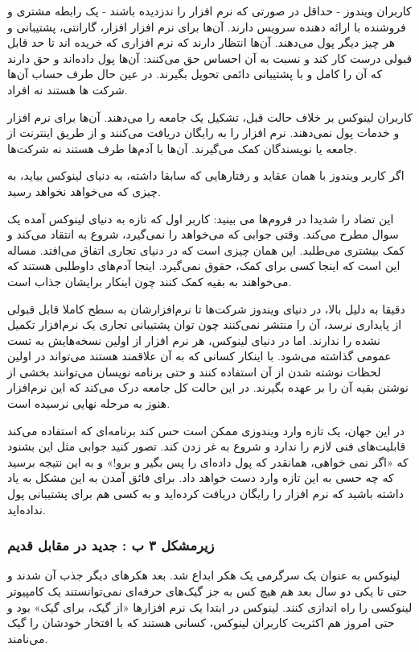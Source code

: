 کاربران ویندوز - حداقل در صورتی که نرم افزار را ندزدیده باشند - یک رابطه مشتری و فروشنده با ارائه دهنده سرویس دارند. آن‌ها برای نرم افزار افزار، گارانتی، پشتیبانی و هر چیز دیگر پول می‌دهند. آن‌ها انتظار دارند که نرم افزاری که خریده اند تا حد قابل قبولی درست کار کند و نسبت به آن احساس حق می‌کنند: آن‌ها پول داده‌اند و حق دارند که آن را کامل و با پشتیبانی دائمی تحویل بگیرند. در عین حال طرف حساب آن‌ها شرکت ها هستند نه افراد.

کاربران لینوکس بر خلاف حالت قبل، تشکیل یک جامعه را می‌دهند. آن‌ها برای نرم افزار و خدمات پول نمی‌دهند. نرم افزار را به رایگان دریافت می‌کنند و از طریق اینترنت از جامعه یا نویسندگان کمک می‌گیرند. آن‌ها با آدم‌ها طرف هستند نه شرکت‌ها.

اگر کاربر ویندوز با همان عقاید و رفتارهایی که سابقا داشته، به دنیای لینوکس بیاید، به چیزی که می‌خواهد نخواهد رسید.

این تضاد را شدیدا در فروم‌ها می بینید: کاربر اول که تازه به دنیای لینوکس آمده یک سوال مطرح می‌کند. وقتی جوابی که می‌خواهد را نمی‌گیرد، شروع به انتقاد می‌کند و کمک بیشتری می‌طلبد. این همان چیزی است که در دنیای تجاری اتفاق می‌افتد. مساله این است که اینجا کسی برای کمک، حقوق نمی‌گیرد. اینجا آدم‌های داوطلبی هستند که می‌خواهند به بقیه کمک کنند چون اینکار برایشان جذاب است.

دقیقا به دلیل بالا، در دنیای ویندوز شرکت‌ها تا نرم‌افزارشان به سطح کاملا قابل قبولی از پایداری نرسد، آن را منتشر نمی‌کنند چون توان پشتیبانی تجاری یک نرم‌افزار تکمیل نشده را ندارند. اما در دنیای لینوکس، هر نرم افزار از اولین نسخه‌هایش به تست عمومی گذاشته می‌شود. با اینکار کسانی که به آن علاقمند هستند می‌تواند در اولین لحظات نوشته شدن از آن استفاده کنند و حتی برنامه نویسان می‌توانند بخشی از نوشتن بقیه آن را بر عهده بگیرند. در این حالت کل جامعه درک می‌کند که این نرم‌افزار هنوز به مرحله نهایی نرسیده است.

در این جهان، یک تازه وارد ویندوزی ممکن است حس کند برنامه‌ای که استفاده می‌کند قابلیت‌های فنی لازم را ندارد و شروع به غر زدن کند. تصور کنید جوابی مثل این بشنود که «اگر نمی خواهی، همانقدر که پول داده‌ای را پس بگیر و برو!» و به این نتیجه برسید که چه حسی به این تازه وارد دست خواهد داد.
برای فائق آمدن به این مشکل به یاد داشته باشید که نرم افزار را رایگان دریافت کرده‌اید و به کسی هم برای پشتیبانی پول نداده‌اید.
\subsubsection*{زیرمشکل ۳ ب : جدید در مقابل قدیم}
\begin{mdframed}
لینوکس به عنوان یک سرگرمی یک هکر ابداع شد. بعد هکرهای دیگر جذب آن شدند و حتی تا یکی دو سال بعد هم هیچ کس به جز گیک‌های حرفه‌ای نمی‌توانستند یک کامپیوتر لینوکسی را راه اندازی کنند. لینوکس در ابتدا یک نرم افزارها «از گیک، برای گیک» بود و حتی امروز هم اکثریت کاربران لینوکس، کسانی هستند که با افتخار خودشان را گیک می‌نامند.
\end{mdframed}


